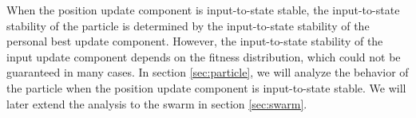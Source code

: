 When the position update component is input-to-state stable, the input-to-state stability of the particle is determined by the input-to-state stability of the personal best update component.
However, the input-to-state stability of the input update component depends on the fitness distribution, which could not be guaranteed in many cases.
In section \ref{sec:particle}, we will analyze the behavior of the particle when the position update component is input-to-state stable.
We will later extend the analysis to the swarm in section \ref{sec:swarm}.

